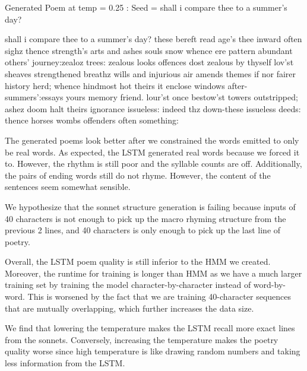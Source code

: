 \noindent Generated Poem at temp =  0.25 :\newline
Seed =  shall i compare thee to a summer's day?

\noindent shall i compare thee to a summer's day?\newline
these bereft read age's thee inward often sighz\newline
thence strength's arts and ashes souls snow\newline
  whence ere pattern abundant others' journey:zealoz trees:\newline
  zealous looks offences dost zealous by thyself\newline
lov'st sheaves strengthened breathz wills\newline
 and injurious air amends\newline
themes if nor fairer history herd;\newline
whence hindmost hot theirs it enclose\newline
windows after-summers':essays yours memory friend.\newline
lour'st once bestow'st towers outstripped;\newline
ashez doom halt theirs ignorance issueless:\newline
indeed thz down-these issueless deeds:\newline
thence horses wombs offenders often something:

The generated poems look better after we constrained the words emitted to only be real words. As expected, the LSTM generated real words because we forced it to. However, the rhythm is still poor and the syllable counts are off. Additionally, the pairs of ending words still do not rhyme. However, the content of the sentences seem somewhat sensible.

We hypothesize that the sonnet structure generation is failing because inputs of 40 characters is not enough to pick up the macro rhyming structure from the previous 2 lines, and 40 characters is only enough to pick up the last line of poetry.

Overall, the LSTM poem quality is still inferior to the HMM we created. Moreover, the runtime for training is longer than HMM as we have a much larger training set by training the model character-by-character instead of word-by-word. This is worsened by the fact that we are training 40-character sequences that are mutually overlapping, which further increases the data size. 

We find that lowering the temperature makes the LSTM recall more exact lines from the sonnets. Conversely, increasing the temperature makes the poetry quality worse since high temperature is like drawing random numbers and taking less information from the LSTM.

